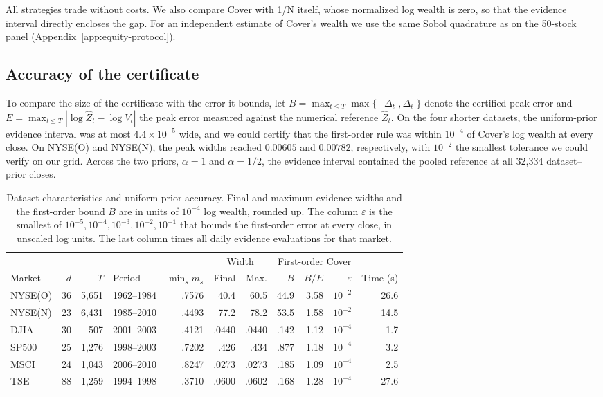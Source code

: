 \documentclass{article}
\numberwithin{equation}{section}
\theoremstyle{remark}
\begin{document}
All strategies trade without costs. We also compare
Cover with 1/N itself, whose normalized log wealth is zero, so that the
evidence interval directly encloses the gap. For an independent estimate
of Cover's wealth we use the same Sobol quadrature as on the 50-stock
panel (Appendix~\ref{app:equity-protocol}).

\subsection{Accuracy of the certificate}
To compare the size of the certificate with the error it bounds, let
$B=\max_{t\le T}\max\{-\Delta_t^-,\Delta_t^+\}$ denote the certified
peak error and $E=\max_{t\le T}|\log\widehat Z_t-\log V_t|$ the peak
error measured against the numerical reference $\widehat Z_t$. On the
four shorter datasets, the uniform-prior evidence interval was at most
$4.4\times10^{-5}$ wide, and we could certify that the first-order rule
was within $10^{-4}$ of Cover's log wealth at every close. On NYSE(O)
and NYSE(N), the peak widths reached $0.00605$ and $0.00782$,
respectively, with $10^{-2}$ the smallest tolerance we could verify on
our grid. Across the two priors, $\alpha=1$ and $\alpha=1/2$, the
evidence interval contained the pooled reference at all 32{,}334
dataset--prior closes.

\begin{table}[tbp]
\centering
\caption{Dataset characteristics and uniform-prior accuracy. Final and maximum
evidence widths and the first-order bound $B$ are in units of $10^{-4}$ log
wealth, rounded up. The column $\varepsilon$ is the smallest of
$10^{-5},10^{-4},10^{-3},10^{-2},10^{-1}$ that bounds the first-order error
at every close, in unscaled log units. The last column times all daily
evidence evaluations for that market.}
\label{tab:bench-accuracy}
\small\setlength{\tabcolsep}{3.1pt}
\begin{tabular}{@{}lrrlrrrrrrr@{}}
\toprule
 & & & & & \multicolumn{2}{c}{Width} & \multicolumn{3}{c}{First-order Cover} & \\
\cmidrule(lr){6-7}\cmidrule(lr){8-10}
Market & $d$ & $T$ & Period & $\min_s m_s$ & Final & Max. &
$B$ & $B/E$ & $\varepsilon$ & Time (s)\\
\midrule
NYSE(O) & 36 & 5,651 & 1962--1984 & .7576 & 40.4 & 60.5 & 44.9 & 3.58 & $10^{-2}$ & 26.6\\
NYSE(N) & 23 & 6,431 & 1985--2010 & .4493 & 77.2 & 78.2 & 53.5 & 1.58 & $10^{-2}$ & 14.5\\
DJIA    & 30 &   507 & 2001--2003 & .4121 & .0440 & .0440 & .142 & 1.12 & $10^{-4}$ & 1.7\\
SP500   & 25 & 1,276 & 1998--2003 & .7202 & .426 & .434 & .877 & 1.18 & $10^{-4}$ & 3.2\\
MSCI    & 24 & 1,043 & 2006--2010 & .8247 & .0273 & .0273 & .185 & 1.09 & $10^{-4}$ & 2.5\\
TSE     & 88 & 1,259 & 1994--1998 & .3710 & .0600 & .0602 & .168 & 1.28 & $10^{-4}$ & 27.6\\
\bottomrule
\end{tabular}
\end{table}
\end{document}
